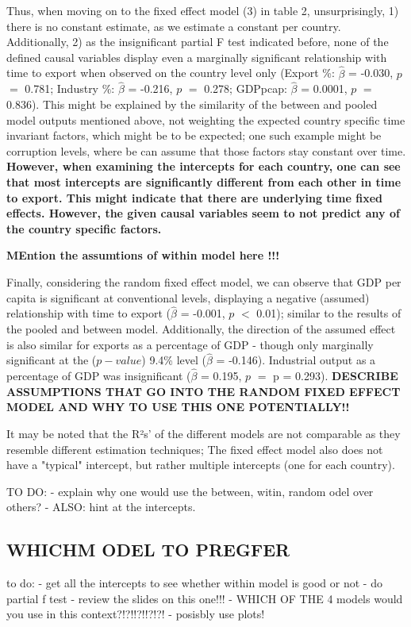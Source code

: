 \documentclass[a4paper]{article}
\begin{document}
Thus, when moving on to the fixed effect model (3) in table 2, unsurprisingly, 1) there is no constant estimate, as we estimate a constant per country. Additionally, 2) as the insignificant partial F test indicated before, none of the defined causal variables display even a marginally significant relationship with time to export when observed on the country level only (Export \%: $\hat{\beta}$ = -0.030, $p$ $=$ 0.781; Industry \%: $\hat{\beta}$ = -0.216, $p$ $=$ 0.278; GDPpcap: $\hat{\beta}$ = 0.0001, $p$ $=$ 0.836). This might be explained by the similarity of the between and pooled model outputs mentioned above, not weighting the expected country specific time invariant factors, which might be to be expected; one such example might be corruption levels, where be can assume that those factors stay constant over time.
\textbf{However, when examining the intercepts for each country, one can see that most intercepts are significantly different from each other in time to export. This might indicate that there are underlying time fixed effects. However, the given causal variables seem to not predict any of the country specific factors.}


\textbf{MEntion the assumtions of within model here !!!}

Finally, considering the random fixed effect model, we can observe that GDP per capita is significant at conventional levels, displaying a negative (assumed) relationship with time to export ($\hat{\beta}$ = -0.001, $p$ $<$ 0.01); similar to the results of the pooled and between model. Additionally, the direction of the assumed effect is also similar for exports as a percentage of GDP - though only marginally significant at the ($p-value$) 9.4\% level ($\hat{\beta}$ = -0.146). Industrial output as a percentage of GDP was insignificant ($\hat{\beta}$ = 0.195, $p$ $=$ p = 0.293).
\textbf{DESCRIBE ASSUMPTIONS THAT GO INTO THE RANDOM FIXED EFFECT MODEL AND WHY TO USE THIS ONE POTENTIALLY!!}


It may be noted that the R²s' of the different models are not comparable as they resemble different estimation techniques; The fixed effect model also does not have a "typical" intercept, but rather multiple intercepts (one for each country). 


TO DO:
- explain why one would use the between, witin, random odel over others? 
- ALSO: hint at the intercepts. 



\subsection{WHICHM ODEL TO PREGFER}
to do:
- get all the intercepts to see whether within model is good or not
- do partial f test
- review the slides on this one!!!
- WHICH OF THE 4 models would you use in this context?!?!!?!!?!?!
- posisbly use plots!
\end{document}
